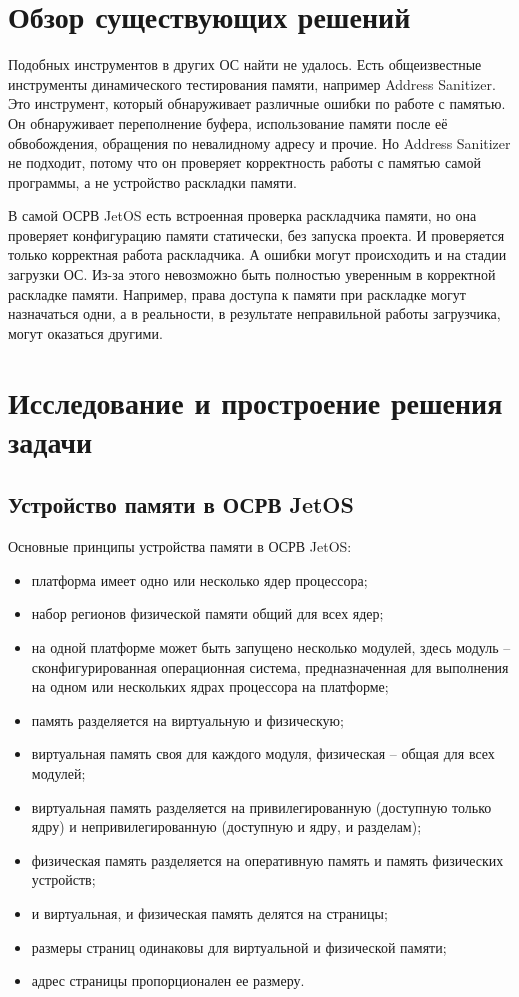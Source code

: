 \documentclass[oneside,senior,etd]{BYUPhys}
\begin{document}
\section{Обзор существующих решений}

Подобных инструментов в других ОС найти не удалось. Есть общеизвестные инструменты
динамического тестирования памяти, например Address Sanitizer. Это инструмент,
который обнаруживает различные ошибки по работе с памятью. Он обнаруживает
переполнение буфера, использование памяти после её обвобождения, обращения по невалидному адресу
и прочие. Но Address Sanitizer не подходит, потому что он проверяет корректность работы с памятью
самой программы, а не устройство раскладки памяти.

В самой ОСРВ JetOS есть встроенная проверка раскладчика памяти, но она проверяет
конфигурацию памяти статически, без запуска проекта. И проверяется только корректная
работа раскладчика. А ошибки могут происходить и на стадии загрузки ОС. Из-за этого
невозможно быть полностью уверенным в корректной раскладке памяти. Например, права
доступа к памяти при раскладке могут назначаться одни, а в реальности,
в результате неправильной работы загрузчика, могут оказаться другими.

\section{Исследование и простроение решения задачи}

\subsection{Устройство памяти в ОСРВ JetOS}

Основные принципы устройства памяти в ОСРВ JetOS:
\begin{itemize}
  \item платформа имеет одно или несколько ядер процессора;
  \item набор регионов физической памяти общий для всех ядер;
  \item на одной платформе может быть запущено несколько модулей,
  здесь модуль -- сконфигурированная операционная система, предназначенная для выполнения
  на одном или нескольких ядрах процессора на платформе;
  \item память разделяется на виртуальную и физическую;
  \item виртуальная память своя для каждого модуля, физическая -- общая для всех модулей;
  \item виртуальная память разделяется на привилегированную (доступную только ядру)
  и непривилегированную (доступную и ядру, и разделам);
  \item физическая память разделяется на оперативную память и память физических устройств;
  \item и виртуальная, и физическая память делятся на страницы;
  \item размеры страниц одинаковы для виртуальной и физической памяти;
  \item адрес страницы пропорционален ее размеру.
\end{itemize}
\end{document}
